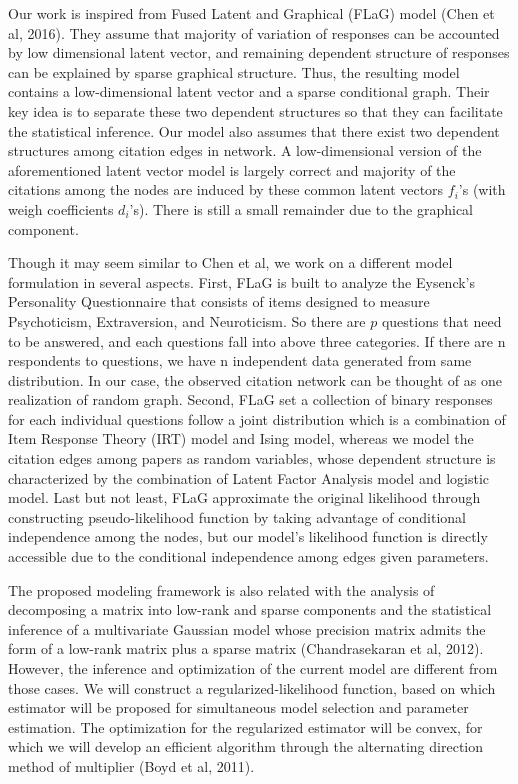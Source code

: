 \documentclass{article}
\begin{document}
Our work is inspired from Fused Latent and Graphical (FLaG) model (Chen et al, 2016). They assume that majority of variation of responses can be accounted by low dimensional latent vector, and remaining dependent structure of responses can be explained by sparse graphical structure. Thus, the resulting model contains a low-dimensional latent vector and a sparse conditional graph. Their key idea is to separate these two dependent structures so that they can facilitate the statistical inference. Our model also assumes that there exist two dependent structures among citation edges in network. A low-dimensional version of the aforementioned latent vector model is largely correct and majority of the citations among the nodes are induced by these common latent vectors $f_{i}$'s (with weigh coefficients $d_{i}$'s). There is still a small remainder due to the graphical component.

Though it may seem similar to Chen et al, we work on a different model formulation in several aspects. First, FLaG is built to analyze the Eysenck’s Personality Questionnaire that consists of items designed to measure Psychoticism, Extraversion, and Neuroticism. So there are $p$ questions that need to be answered, and each questions fall into above three categories. If there are n respondents to questions, we have n independent data generated from same distribution. In our case, the observed citation network can be thought of as one realization of random graph. Second, FLaG set a collection of binary responses for each individual questions follow a joint distribution which is a combination of Item Response Theory (IRT) model and Ising model, whereas we model the citation edges among papers as random variables, whose dependent structure is characterized by the combination of Latent Factor Analysis model and logistic model. Last but not least, FLaG approximate the original likelihood through constructing pseudo-likelihood function by taking advantage of conditional independence among the nodes, but our model’s likelihood function is directly accessible due to the conditional independence among edges given parameters.

The proposed modeling framework is also related with the analysis of decomposing a matrix into low-rank and sparse components and the statistical inference of a multivariate Gaussian model whose precision matrix admits the form of a low-rank matrix plus a sparse matrix (Chandrasekaran et al, 2012). However, the inference and optimization of the current model are different from those cases. We will construct a regularized-likelihood function, based on which estimator will be proposed for simultaneous model selection and parameter estimation. The optimization for the regularized estimator will be convex, for which we will develop an efficient algorithm through the alternating direction method of multiplier (Boyd et al, 2011).
\end{document}
